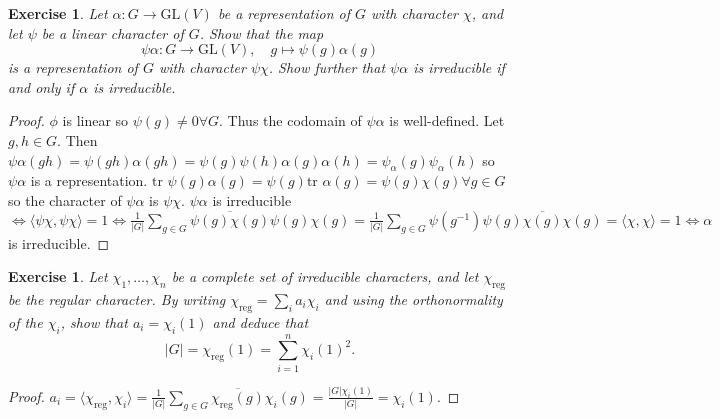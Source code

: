 \documentclass{article}
\newtheorem{exercise}[theorem]{Exercise}
\begin{document}
\begin{exercise}
Let \( \alpha: G \to \mathrm{GL}(V) \) be a representation of \( G \) with character \( \chi \), and let \( \psi \) be a linear character of \( G \). Show that the map
\[
\psi \alpha: G \to \mathrm{GL}(V), \quad g \mapsto \psi(g) \alpha(g)
\]
is a representation of \( G \) with character \( \psi \chi \). Show further that \( \psi \alpha \) is irreducible if and only if \( \alpha \) is irreducible.
\end{exercise}
\begin{proof}
$\phi$ is linear so $\psi(g)\neq 0 \forall G$. Thus the codomain of $\psi\alpha$ is well-defined. Let $g,h\in G$. Then $\psi\alpha(gh)=\psi(gh)\alpha(gh)=\psi(g)\psi(h)\alpha(g)\alpha(h)=\psi_\alpha(g)\psi_\alpha(h)$ so $\psi\alpha$ is a representation. $\text{tr }\psi(g)\alpha(g)=\psi(g)\text{tr }\alpha(g)=\psi(g)\chi(g)\forall g\in G$ so the character of $\psi\alpha$ is $\psi\chi$. $\psi\alpha$ is irreducible $\iff\langle\psi\chi,\psi\chi\rangle=1\iff \frac{1}{|G|}\sum_{g\in G}\overline{\psi(g)\chi(g)}\psi(g)\chi(g)=\frac{1}{|G|}\sum_{g\in G}\psi(g^{-1})\psi(g)\overline{\chi(g)}\chi(g)=\langle\chi,\chi\rangle=1\iff\alpha$ is irreducible. 
\end{proof}

\begin{exercise}
Let \( \chi_1, \ldots, \chi_n \) be a complete set of irreducible characters, and let \( \chi_{\text{reg}} \) be the regular character. By writing \( \chi_{\text{reg}} = \sum_i a_i \chi_i \) and using the orthonormality of the \( \chi_i \), show that \( a_i = \chi_i(1) \) and deduce that
\[
|G| = \chi_{\text{reg}}(1) = \sum_{i=1}^n \chi_i(1)^2.
\]
\end{exercise}
\begin{proof}
$a_i=\langle\chi_{\text{reg}},\chi_i\rangle=\frac{1}{|G|}\sum_{g\in G}\overline{\chi_{\text{reg}}(g)}\chi_i(g)=\frac{|G|\chi_i(1)}{|G|}=\chi_i(1)$.
\end{proof}
\end{document}
